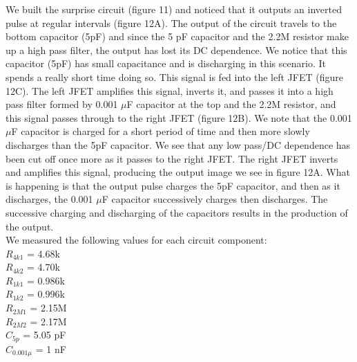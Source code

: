 \documentclass{article}
\begin{document}
    We built the surprise circuit (figure 11) and noticed that it outputs an inverted pulse at regular intervals (figure 12A). The output of the circuit travels to the bottom capacitor (5pF) and since the 5 pF capacitor and the 2.2M resistor make up a high pass filter, the output has lost its DC dependence. We notice that this capacitor (5pF) has small capacitance and is discharging in this scenario. It spends a really short time doing so. This signal is fed into the left JFET (figure 12C). The left JFET amplifies this signal, inverts it, and passes it into a high pass filter formed by 0.001 $\mu$F capacitor at the top and the 2.2M resistor, and this signal passes through to the right JFET (figure 12B). We note that the 0.001 $\mu$F capacitor is charged for a short period of time and then more slowly discharges than the 5pF capacitor. We see that any low pass/DC dependence has been cut off once more as it passes to the right JFET. The right JFET inverts and amplifies this signal, producing the output image we see in figure 12A. What is happening is that the output pulse charges the 5pF capacitor, and then as it discharges, the 0.001 $\mu$F capacitor successively charges then discharges. The successive charging and discharging of the capacitors results in the production of the output.\\ We measured the following values for each circuit component:\\
    $R_{4k1}$ = 4.68k\\ 
    $R_{4k2}$ = 4.70k\\ 
    $R_{1k1}$ = 0.986k\\ 
    $R_{1k2}$ = 0.996k\\ 
    $R_{2M1}$ = 2.15M\\ 
    $R_{2M2}$ = 2.17M\\ 
    $C_{5p}$ = 5.05 pF\\
    $C_{0.001\mu}$ = 1 nF
    
\end{document}
